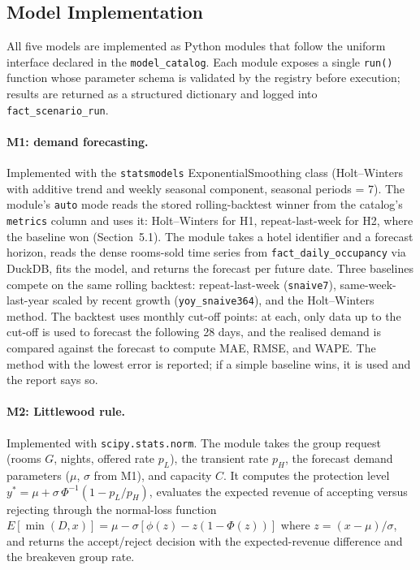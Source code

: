 \subsection{Model Implementation}

All five models are implemented as Python modules that follow the uniform interface declared in the \texttt{model\_catalog}. Each module exposes a single \texttt{run()} function whose parameter schema is validated by the registry before execution; results are returned as a structured dictionary and logged into \texttt{fact\_scenario\_run}.

\paragraph{M1: demand forecasting.}
Implemented with the \texttt{statsmodels} ExponentialSmoothing class (Holt--Winters with additive trend and weekly seasonal component, seasonal periods = 7). The module's \texttt{auto} mode reads the stored rolling-backtest winner from the catalog's \texttt{metrics} column and uses it: Holt--Winters for H1, repeat-last-week for H2, where the baseline won (Section~5.1). The module takes a hotel identifier and a forecast horizon, reads the dense rooms-sold time series from \texttt{fact\_daily\_occupancy} via DuckDB, fits the model, and returns the forecast per future date. Three baselines compete on the same rolling backtest: repeat-last-week (\texttt{snaive7}), same-week-last-year scaled by recent growth (\texttt{yoy\_snaive364}), and the Holt--Winters method. The backtest uses monthly cut-off points: at each, only data up to the cut-off is used to forecast the following 28 days, and the realised demand is compared against the forecast to compute MAE, RMSE, and WAPE. The method with the lowest error is reported; if a simple baseline wins, it is used and the report says so.

\paragraph{M2: Littlewood rule.}
Implemented with \texttt{scipy.stats.norm}. The module takes the group request (rooms $G$, nights, offered rate $p_L$), the transient rate $p_H$, the forecast demand parameters ($\mu$, $\sigma$ from M1), and capacity $C$. It computes the protection level $y^{*} = \mu + \sigma\,\Phi^{-1}(1 - p_L/p_H)$, evaluates the expected revenue of accepting versus rejecting through the normal-loss function $E[\min(D, x)] = \mu - \sigma[\phi(z) - z(1 - \Phi(z))]$ where $z = (x - \mu)/\sigma$, and returns the accept/reject decision with the expected-revenue difference and the breakeven group rate.

